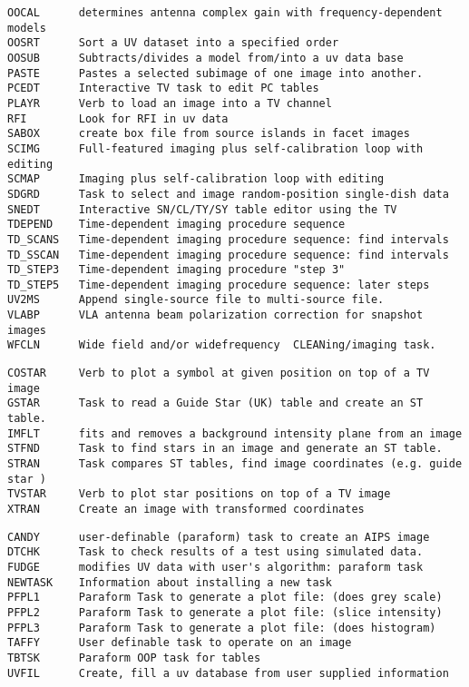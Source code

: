 \begin{verbatim}
OOCAL      determines antenna complex gain with frequency-dependent models
OOSRT      Sort a UV dataset into a specified order
OOSUB      Subtracts/divides a model from/into a uv data base
PASTE      Pastes a selected subimage of one image into another.
PCEDT      Interactive TV task to edit PC tables
PLAYR      Verb to load an image into a TV channel
RFI        Look for RFI in uv data
SABOX      create box file from source islands in facet images
SCIMG      Full-featured imaging plus self-calibration loop with editing
SCMAP      Imaging plus self-calibration loop with editing
SDGRD      Task to select and image random-position single-dish data
SNEDT      Interactive SN/CL/TY/SY table editor using the TV
TDEPEND    Time-dependent imaging procedure sequence
TD_SCANS   Time-dependent imaging procedure sequence: find intervals
TD_SSCAN   Time-dependent imaging procedure sequence: find intervals
TD_STEP3   Time-dependent imaging procedure "step 3"
TD_STEP5   Time-dependent imaging procedure sequence: later steps
UV2MS      Append single-source file to multi-source file.
VLABP      VLA antenna beam polarization correction for snapshot images
WFCLN      Wide field and/or widefrequency  CLEANing/imaging task.
\end{verbatim}\eve


\vskip 0.5pt
\bbve\begin{verbatim}
COSTAR     Verb to plot a symbol at given position on top of a TV image
GSTAR      Task to read a Guide Star (UK) table and create an ST table.
IMFLT      fits and removes a background intensity plane from an image
STFND      Task to find stars in an image and generate an ST table.
STRAN      Task compares ST tables, find image coordinates (e.g. guide star )
TVSTAR     Verb to plot star positions on top of a TV image
XTRAN      Create an image with transformed coordinates
\end{verbatim}\eve


\vskip 0.5pt
\bbve\begin{verbatim}
CANDY      user-definable (paraform) task to create an AIPS image
DTCHK      Task to check results of a test using simulated data.
FUDGE      modifies UV data with user's algorithm: paraform task
NEWTASK    Information about installing a new task
PFPL1      Paraform Task to generate a plot file: (does grey scale)
PFPL2      Paraform Task to generate a plot file: (slice intensity)
PFPL3      Paraform Task to generate a plot file: (does histogram)
TAFFY      User definable task to operate on an image
TBTSK      Paraform OOP task for tables
UVFIL      Create, fill a uv database from user supplied information
\end{verbatim}\eve

